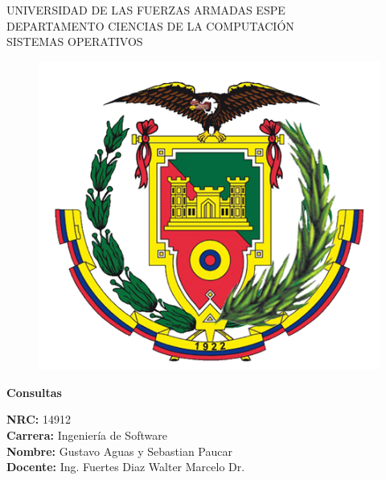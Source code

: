 \documentclass[11pt,twoside]{book}
\begin{document}
\begin{center}
  \LARGE UNIVERSIDAD DE LAS FUERZAS ARMADAS ESPE\\[0.5cm]
  \Large DEPARTAMENTO CIENCIAS DE LA COMPUTACIÓN \\[0.5cm]
  \large SISTEMAS OPERATIVOS\\[0.5cm]
  \begin{figure}[htb] \centering \includegraphics[scale=.6]{Logo_ESPE} \end{figure}
  \vspace{0.5cm}
  \large{\bf Consultas }\\ \vspace{.25cm}
\end{center}

\begin{flushleft}
  \Large{\bf NRC: } 14912 \textbf{}\\
  \vspace{0.5cm}
  \Large{\bf Carrera:} Ingeniería de Software\\
  \vspace{0.5cm}
  \Large{\bf Nombre: } Gustavo Aguas y Sebastian Paucar\\
  \vspace{0.5cm}
  \Large{\bf Docente: } Ing. Fuertes Diaz Walter Marcelo Dr.\\
  \vspace{0.5cm}
  \vspace{0.5cm}
\end{flushleft}
\end{document}
